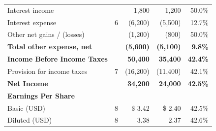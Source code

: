 \begin{tabularx}{\textwidth}{L c R R R}
  \quad Interest income & & 1,800 & 1,200 & 50.0\% \\
  \quad Interest expense & 6 & (6,200) & (5,500) & 12.7\% \\
  \quad Other net gains / (losses) & & (1,200) & (800) & 50.0\% \\
  \textbf{Total other expense, net} & & \textbf{(5,600)} & \textbf{(5,100)} & \textbf{9.8\%} \\
  \midrule
  \textbf{Income Before Income Taxes} & & \textbf{50,400} & \textbf{35,400} & \textbf{42.4\%} \\
  \quad Provision for income taxes & 7 & (16,200) & (11,400) & 42.1\% \\
  \midrule
  \textbf{Net Income} & & \textbf{34,200} & \textbf{24,000} & \textbf{42.5\%} \\
  \midrule
  \textbf{Earnings Per Share} & & & & \\
  \quad Basic (USD) & 8 & \$ 3.42 & \$ 2.40 & 42.5\% \\
  \quad Diluted (USD) & 8 & 3.38 & 2.37 & 42.6\% \\
  \bottomrule
\end{tabularx}

\clearpage

